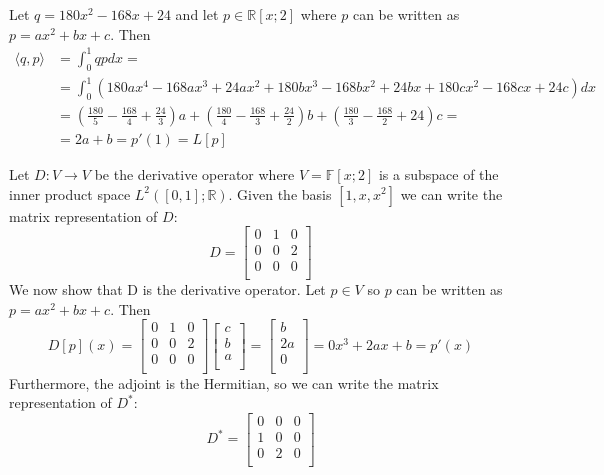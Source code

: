 \documentclass[12pt]{article}
\newcommand{\R}{\mathbb{R}}
\newcommand{\F}{\mathbb{F}}
\newenvironment{problem}[2][Problem]{\begin{trivlist}
\item[\hskip \labelsep {\bfseries #1}\hskip \labelsep {\bfseries #2}]}{\end{trivlist}}
\begin{document}
\begin{problem}{37.} 
Let $q=180x^2 -168x+24$ and  let $p \in \R[x;2]$ where $p$ can be written as  $p=ax^2 +bx+c$. Then
\begin{equation*}
\begin{aligned}
 \langle q,p \rangle &= \int_0^1 qpdx =\\
 &= \int_0^1 (180ax^4 - 168ax^3 + 24ax^2 + 180bx^3 -168bx^2   + 24bx + 180cx^2 - 168cx + 24c)dx \\
 &= (\frac{180}{5} - \frac{168}{4} + \frac{24}{3})a + (\frac{180}{4} - \frac{168}{3} + \frac{24}{2})b + (\frac{180}{3} - \frac{168}{2} +24)c = \\
 & =  2a + b = p'(1) = L[p]
 \end{aligned}
 \end{equation*}
\end{problem}

\begin{problem}{38.} 
Let $D: V \to V$ be the derivative operator where $V  = \F[x;2]$ is a subspace of the inner product space $L^2([0,1]; \R)$. Given the basis $[1,x,x^2]$ we can write the matrix representation of $D$:
\[
   D=
  \left[ {\begin{array}{ccc}
   0 & 1 & 0\\
   0 & 0 & 2\\
   0 & 0 & 0\\
  \end{array} } \right]
\]
We now show that D is the derivative operator. Let $p \in V$ so $p$ can be written as  $p=ax^2 +bx+c$. Then 
\[
   D[p](x)=
  \left[ {\begin{array}{ccc}
   0 & 1 & 0\\
   0 & 0 & 2\\
   0 & 0 & 0\\
  \end{array} } \right]
  \left[ {\begin{array}{c}
   c \\
   b \\
   a \\
  \end{array} } \right] = 
  \left[ {\begin{array}{c}
   b \\
   2a \\
   0 \\
  \end{array} } \right]= 0x^3 + 2ax + b  = p'(x)
\] 
Furthermore, the adjoint is the Hermitian, so we can write the matrix representation of $D^*$:
\[
   D^* =
  \left[ {\begin{array}{ccc}
   0 & 0 & 0\\
   1 & 0 & 0\\
   0 & 2 & 0\\
  \end{array} } \right]
\] 

\end{problem}
\end{document}
